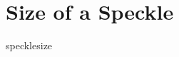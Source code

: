 \documentclass[12pt,a4paper,titlepage,onecolumn]{report}
\begin{document}
\section{Size of a Speckle}\label{sec:sprspecklesize}
{specklesize}
\end{document}
